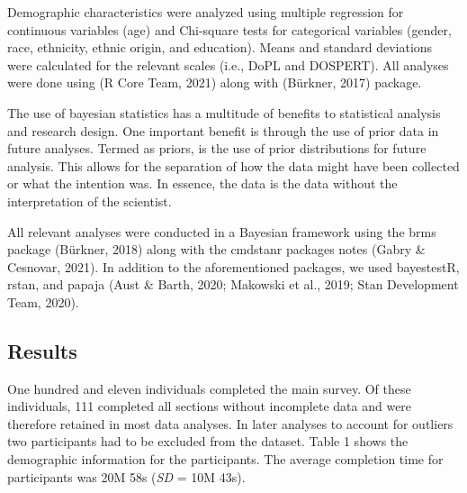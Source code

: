 \documentclass[
  donotrepeattitle,doc, 12pt, a4paper,floatsintext]{apa7}
\begin{document}
Demographic characteristics were analyzed using multiple regression for continuous variables (age) and Chi-square tests for categorical variables (gender, race, ethnicity, ethnic origin, and education). Means and standard deviations were calculated for the relevant scales (i.e., DoPL and DOSPERT). All analyses were done using (R Core Team, 2021) along with (Bürkner, 2017) package.

The use of bayesian statistics has a multitude of benefits to statistical analysis and research design. One important benefit is through the use of prior data in future analyses. Termed as priors, is the use of prior distributions for future analysis. This allows for the separation of how the data might have been collected or what the intention was. In essence, the data is the data without the interpretation of the scientist.

All relevant analyses were conducted in a Bayesian framework using the brms package (Bürkner, 2018) along with the cmdstanr packages notes (Gabry \& Cesnovar, 2021). In addition to the aforementioned packages, we used bayestestR, rstan, and papaja (Aust \& Barth, 2020; Makowski et al., 2019; Stan Development Team, 2020).

\hypertarget{results}{%
\subsection{Results}\label{results}}

One hundred and eleven individuals completed the main survey. Of these individuals, 111 completed all sections without incomplete data and were therefore retained in most data analyses. In later analyses to account for outliers two participants had to be excluded from the dataset. Table 1 shows the demographic information for the participants. The average completion time for participants was 20M 58s (\emph{SD} = 10M 43s).
\end{document}
